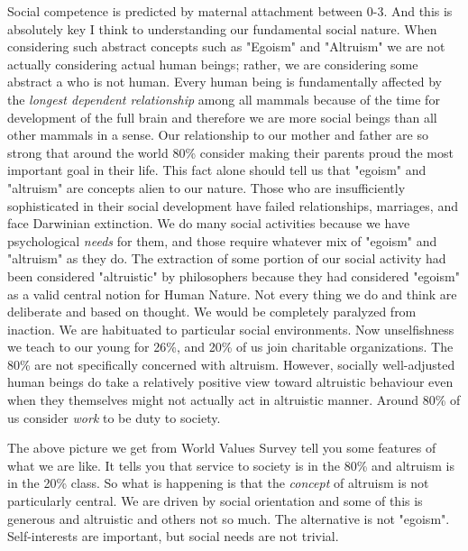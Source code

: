 \documentclass{amsart}
\begin{document}
Social competence is predicted by maternal attachment between 0-3.  And this is absolutely key I think to understanding our fundamental social nature.  When considering such abstract concepts such as "Egoism" and "Altruism" we are not actually considering actual human beings; rather, we are considering some abstract a who is not human.  Every human being is fundamentally affected by the {\em longest dependent relationship} among all mammals because of the time for development of the full brain and therefore we are more social beings than all other mammals in a sense.  Our relationship to our mother and father are so strong that around the world 80\% consider making their parents proud the most important goal in their life.  This fact alone should tell us that "egoism" and "altruism" are concepts alien to our nature.  Those who are insufficiently sophisticated in their social development have failed relationships, marriages, and face Darwinian extinction.  We do many social activities because we have psychological {\em needs} for them, and those require whatever mix of "egoism" and "altruism" as they do.  The extraction of some portion of our social activity had been considered "altruistic" by philosophers because they had considered "egoism" as a valid central notion for Human Nature.  Not every thing we do and think are deliberate and based on thought.  We would be completely paralyzed from inaction. We are habituated to particular social environments.  Now unselfishness we teach to our young for 26\%, and 20\% of us join charitable organizations.  The 80\% are not specifically concerned with altruism.  However, socially well-adjusted human beings do take a relatively positive view toward altruistic behaviour even when they themselves might not actually act in altruistic manner.  Around 80\% of us consider {\em work} to be duty to society. 

The above picture we get from World Values Survey tell you some features of what we are like.  It tells you that service to society is in the 80\% and altruism is in the 20\% class.  So what is happening is that the {\em concept} of altruism is not particularly central.  We are driven by social orientation and some of this is generous and altruistic and others not so much.  The alternative is not "egoism".  Self-interests are important, but social needs are not trivial.
\end{document}
